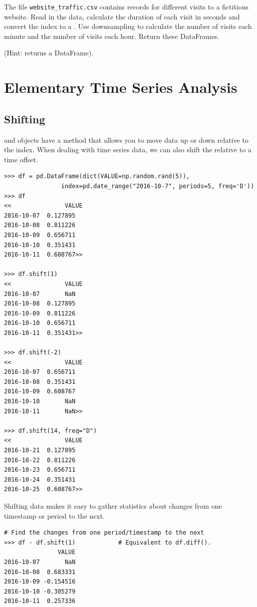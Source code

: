 \begin{problem} %
The file \texttt{website\_traffic.csv} contains records for different visits to a fictitious website.
Read in the data, calculate the duration of each visit in seconds and convert the index to a .
Use downsampling to calculate the number of visits each minute and the number of visits each hour.
Return these DataFrames.

(Hint:  returns a DataFrame).
\end{problem}

\section*{Elementary Time Series Analysis} %

\subsection*{Shifting}

 and  objects have a  method that allows you to move data up or down relative to the index.
When dealing with time series data, we can also shift the  relative to a time offset.

\begin{lstlisting}
>>> df = pd.DataFrame(dict(VALUE=np.random.rand(5)),
                index=pd.date_range("2016-10-7", periods=5, freq='D'))
>>> df
<<               VALUE
2016-10-07  0.127895
2016-10-08  0.811226
2016-10-09  0.656711
2016-10-10  0.351431
2016-10-11  0.608767>>

>>> df.shift(1)
<<               VALUE
2016-10-07       NaN
2016-10-08  0.127895
2016-10-09  0.811226
2016-10-10  0.656711
2016-10-11  0.351431>>

>>> df.shift(-2)
<<               VALUE
2016-10-07  0.656711
2016-10-08  0.351431
2016-10-09  0.608767
2016-10-10       NaN
2016-10-11       NaN>>

>>> df.shift(14, freq="D")
<<               VALUE
2016-10-21  0.127895
2016-10-22  0.811226
2016-10-23  0.656711
2016-10-24  0.351431
2016-10-25  0.608767>>
\end{lstlisting}

Shifting data makes it easy to gather statistics about changes from one timestamp or period to the next.

\begin{lstlisting}
# Find the changes from one period/timestamp to the next
>>> df - df.shift(1)            # Equivalent to df.diff().
               VALUE
2016-10-07       NaN
2016-10-08  0.683331
2016-10-09 -0.154516
2016-10-10 -0.305279
2016-10-11  0.257336
\end{lstlisting}

